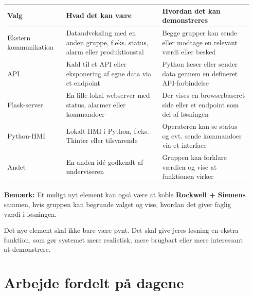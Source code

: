 \documentclass[12pt, a4paper]{article}
\begin{document}
\begin{center}
\begin{tabularx}{\textwidth}{lXX}
\toprule
\textbf{Valg} & \textbf{Hvad det kan være} & \textbf{Hvordan det kan demonstreres} \\
\midrule
Ekstern kommunikation & Dataudveksling med en anden gruppe, f.eks. status, alarm eller produktionstal & Begge grupper kan sende eller modtage en relevant værdi eller besked \\[6pt]

API & Kald til et API eller eksponering af egne data via et endpoint & Python læser eller sender data gennem en defineret API-forbindelse \\[6pt]

Flask-server & En lille lokal webserver med status, alarmer eller kommandoer & Der vises en browserbaseret side eller et endpoint som del af løsningen \\[6pt]

Python-HMI & Lokalt HMI i Python, f.eks. Tkinter eller tilsvarende & Operatøren kan se status og evt. sende kommandoer via et interface \\[6pt]

Andet & En anden idé godkendt af underviseren & Gruppen kan forklare værdien og vise at funktionen virker \\
\bottomrule
\end{tabularx}
\end{center}

\vspace{0.2cm}
\noindent\textbf{Bemærk:} Et muligt nyt element kan også være at koble
\textbf{Rockwell + Siemens} sammen, hvis gruppen kan begrunde valget og vise,
hvordan det giver faglig værdi i løsningen.

\begin{tcolorbox}[tipbox, title={\faStar\quad God tommelfingerregel}]
Det nye element skal ikke bare være pynt. Det skal give jeres løsning en ekstra
funktion, som gør systemet mere realistisk, mere brugbart eller mere interessant
at demonstrere.
\end{tcolorbox}

\section{Arbejde fordelt på dagene}
\end{document}
